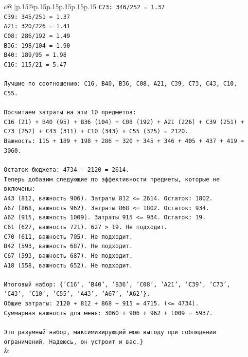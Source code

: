 \documentclass{article}
\begin{document}
{\begin{supertabular}{c@{$\;$}|p{.15\linewidth}@{}p{.15\linewidth}p{.15\linewidth}p{.15\linewidth}p{.15\linewidth}p{.15\linewidth}}
{{{\texttt{C73: 346/252 = 1.37} \\
\texttt{C39: 345/251 = 1.37} \\
\texttt{A21: 320/226 = 1.41} \\
\texttt{C08: 286/192 = 1.49} \\
\texttt{B36: 198/104 = 1.90} \\
\texttt{B40: 189/95 = 1.98} \\
\texttt{C16: 115/21 = 5.47} \\
\\ 
\texttt{Лучшие по соотношению: C16, B40, B36, C08, A21, C39, C73, C43, C10, C55.} \\
\\ 
\texttt{Посчитаем затраты на эти 10 предметов:} \\
\texttt{C16 (21) + B40 (95) + B36 (104) + C08 (192) + A21 (226) + C39 (251) + C73 (252) + C43 (311) + C10 (343) + C55 (325) = 2120.} \\
\texttt{Важность: 115 + 189 + 198 + 286 + 320 + 345 + 346 + 405 + 437 + 419 = 3060.} \\
\\ 
\texttt{Остаток бюджета: 4734 {-} 2120 = 2614.} \\
\texttt{Теперь добавим следующие по эффективности предметы, которые не включены:} \\
\texttt{A43 (812, важность 906). Затраты 812 <= 2614. Остаток: 1802.} \\
\texttt{A67 (868, важность 962). Затраты 868 <= 1802. Остаток: 934.} \\
\texttt{A62 (915, важность 1009). Затраты 915 <= 934. Остаток: 19.} \\
\texttt{C61 (627, важность 721). 627 > 19. Не подходит.} \\
\texttt{C70 (611, важность 705). Не подходит.} \\
\texttt{B42 (593, важность 687). Не подходит.} \\
\texttt{C67 (593, важность 687). Не подходит.} \\
\texttt{A18 (558, важность 652). Не подходит.} \\
\\ 
\texttt{Итоговый набор: \{'C16', 'B40', 'B36', 'C08', 'A21', 'C39', 'C73', 'C43', 'C10', 'C55', 'A43', 'A67', 'A62'\}.} \\
\texttt{Общие затраты: 2120 + 812 + 868 + 915 = 4715. (<= 4734).} \\
\texttt{Суммарная важность для меня: 3060 + 906 + 962 + 1009 = 5937.} \\
\\ 
\texttt{Это разумный набор, максимизирующий мою выгоду при соблюдении ограничений. Надеюсь, он устроит и вас.\}} \\
            }
        }
    }
    & \\ \\


\end{supertabular}}
\end{document}
